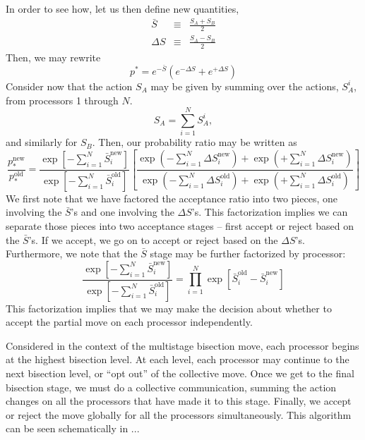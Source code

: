 \documentclass{article}
\begin{document}
In order to see how, let us then define new quantities,
\begin{eqnarray}
\bar{S} & \equiv & \frac{S_A + S_B}{2} \\
\Delta S & \equiv & \frac{S_A - S_B}{2} 
\end{eqnarray}
Then, we may rewrite
\begin{equation}
p^* = e^{-\bar{S}}\left(e^{-\Delta S} + e^{+\Delta S} \right)
\end{equation}
Consider now that the action $S_A$ may be given by summing over the
actions, $S_A^i$, from processors 1 through $N$.  
\begin{equation}
S_A = \sum_{i=1}^N S_A^i,
\end{equation}
and similarly for $S_B$.  Then, our probability ratio may be written
as
\begin{equation}
\frac{p_*^\text{new}}{p_*^\text{old}} = 
\frac{\exp \left[-\sum_{i=1}^{N} \bar{S}^\text{new}_i \right]}
{\exp \left[-\sum_{i=1}^{N} \bar{S}^\text{old}_i \right]}
\left[
\frac{\exp \left(-\sum_{i=1}^N \Delta S_i^\text{new} \right) +
\exp \left(+\sum_{i=1}^N \Delta S_i^\text{new} \right)}
{\exp \left(-\sum_{i=1}^N \Delta S_i^\text{old} \right)+
\exp \left(+\sum_{i=1}^N \Delta S_i^\text{old} \right)} \right]
\end{equation}
We first note that we have factored the acceptance ratio into two
pieces, one involving the $\bar{S}$'s and one involving the $\Delta
S$'s. This factorization implies we can separate those pieces into two
acceptance stages -- first accept or reject based on the $\bar{S}$'s.
If we accept, we go on to accept or reject based on the $\Delta S$'s.
Furthermore, we note that the $\bar{S}$ stage may be further
factorized by processor:
\begin{equation}
\frac{\exp \left[-\sum_{i=1}^{N} \bar{S}^\text{new}_i \right]}
{\exp \left[-\sum_{i=1}^{N} \bar{S}^\text{old}_i \right]} =
\prod_{i=1}^N \exp \left[ \bar{S}_i^\text{old} - \bar{S}_i^\text{new}\right]
\end{equation}
This factorization implies that we may make the decision about whether
to accept the partial move on each processor independently.

Considered in the context of the multistage bisection move, each
processor begins at the highest bisection level.  At each level, each
processor may continue to the next bisection level, or ``opt out'' of
the collective move.  Once we get to the final bisection stage, we
must do a collective communication, summing the action changes on all
the processors that have made it to this stage.  Finally, we accept or
reject the move globally for all the processors simultaneously.  This
algorithm can be seen schematically in ...
\end{document}
